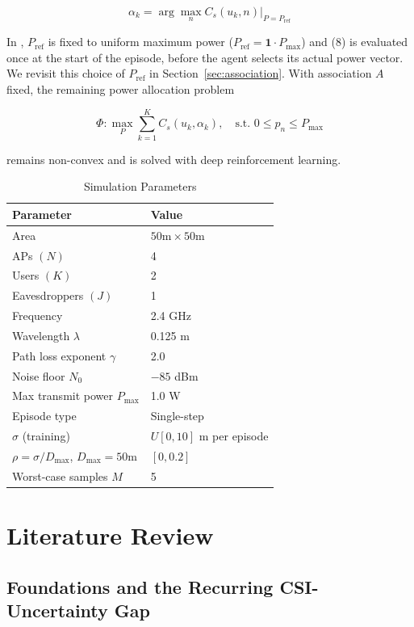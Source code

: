 \documentclass[conference]{IEEEtran}
\begin{document}
\begin{equation}
\alpha_k=
\arg\max_n
C_s(u_k,n)\big|_{P=P_{\text{ref}}}
\end{equation}

In \cite{hoseini}, $P_{\text{ref}}$ is fixed to uniform maximum power ($P_{\text{ref}}=\mathbf{1}\cdot P_{\max}$) and (8) is evaluated once at the start of the episode, before the agent selects its actual power vector. We revisit this choice of $P_{\text{ref}}$ in Section~\ref{sec:association}. With association $A$ fixed, the remaining power allocation problem

\begin{equation}
\Phi:\max_{P}\sum_{k=1}^{K}C_s(u_k,\alpha_k),
\quad
\text{s.t. }0\leq p_n\leq P_{\max}
\end{equation}

remains non-convex and is solved with deep reinforcement learning.

\begin{table}[t]
\caption{Simulation Parameters}
\centering
\begin{tabular}{|l|l|}
\hline
\textbf{Parameter} & \textbf{Value} \\
\hline
Area & $50\text{m} \times 50\text{m}$ \\
APs $(N)$ & 4 \\
Users $(K)$ & 2 \\
Eavesdroppers $(J)$ & 1 \\
Frequency & 2.4 GHz \\
Wavelength $\lambda$ & 0.125 m \\
Path loss exponent $\gamma$ & 2.0 \\
Noise floor $N_0$ & $-85$ dBm \\
Max transmit power $P_{\max}$ & 1.0 W \\
Episode type & Single-step \\
$\sigma$ (training) & $U[0,10]$ m per episode \\
$\rho=\sigma/D_{\max}$, $D_{\max}=50$m & $[0, 0.2]$ \\
Worst-case samples $M$ & 5 \\
\hline
\end{tabular}
\end{table}

\section{Literature Review}
\label{sec:litreview}

\subsection{Foundations and the Recurring CSI-Uncertainty Gap}
\end{document}
